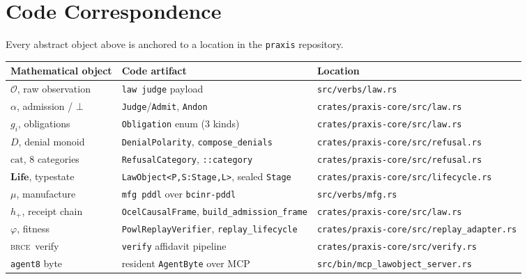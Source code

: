\documentclass[11pt,oneside]{book}
\theoremstyle{definition}
\theoremstyle{plain}
\theoremstyle{remark}
\newcommand{\Obs}{\mathcal{O}}                 %
\newcommand{\muop}{\mu}                        %
\newcommand{\adm}{\alpha}                      %
\newcommand{\Rfsl}{\bot}                        %
\newcommand{\Fitness}{\varphi}
\newcommand{\Life}{\mathbf{Life}}
\newcommand{\BRCE}{\textsc{brce}}
\newcommand{\code}[1]{\texttt{#1}}
\begin{document}
\chapter{Code Correspondence}
Every abstract object above is anchored to a location in the \code{praxis} repository.
\begin{center}
\begin{tabular}{lll}
\toprule
Mathematical object & Code artifact & Location \\
\midrule
$\Obs$, raw observation & \code{law judge} payload & \code{src/verbs/law.rs} \\
$\adm$, admission / $\Rfsl$ & \code{Judge}/\code{Admit}, \code{Andon} & \code{crates/praxis-core/src/law.rs} \\
$g_i$, obligations & \code{Obligation} enum (3 kinds) & \code{crates/praxis-core/src/law.rs} \\
$D$, denial monoid & \code{DenialPolarity}, \code{compose\_denials} & \code{crates/praxis-core/src/refusal.rs} \\
$\text{cat}$, 8 categories & \code{RefusalCategory}, \code{::category} & \code{crates/praxis-core/src/refusal.rs} \\
$\Life$, typestate & \code{LawObject<P,S:Stage,L>}, sealed \code{Stage} & \code{crates/praxis-core/src/lifecycle.rs} \\
$\muop$, manufacture & \code{mfg pddl} over \code{bcinr-pddl} & \code{src/verbs/mfg.rs} \\
$h_{+}$, receipt chain & \code{OcelCausalFrame}, \code{build\_admission\_frame} & \code{crates/praxis-core/src/law.rs} \\
$\Fitness$, fitness & \code{PowlReplayVerifier}, \code{replay\_lifecycle} & \code{crates/praxis-core/src/replay\_adapter.rs} \\
\BRCE\ verify & \code{verify} affidavit pipeline & \code{crates/praxis-core/src/verify.rs} \\
\code{agent8} byte & resident \code{AgentByte} over MCP & \code{src/bin/mcp\_lawobject\_server.rs} \\
\bottomrule
\end{tabular}
\end{center}
\end{document}
